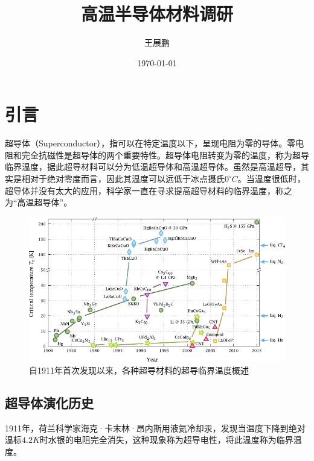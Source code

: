 \documentclass[UTF8, twocolumn]{ctexart}
\title{\fangsong 高温半导体材料调研}
\author{\kaishu 王展鹏}
\date{\today}
\begin{document}

\section{引言}

    超导体（Superconductor），指可以在特定温度以下，呈现电阻为零的导体。零电阻和完全抗磁性是超导体的两个重要特性。超导体电阻转变为零的温度，称为超导临界温度，据此超导材料可以分为低温超导体和高温超导体。虽然是高温超导，其实是相对于绝对零度而言，因此其温度可以远低于冰点摄氏$ 0 ^\circ C$。当温度很低时，超导体并没有太大的应用，科学家一直在寻求提高超导材料的临界温度，称之为“高温超导体”。

    \begin{figure}[hb]
        \centering
        \includegraphics[scale=1.2]{image/Timeline_of_Superconductivity_from_1900_to_2015.pdf}
        \caption{自1911年首次发现以来，各种超导材料的超导临界温度概述}
        \label{fig:image1}
    \end{figure}

    \subsection{超导体演化历史}
    1911年，荷兰科学家海克·卡末林·昂内斯用液氦冷却汞，发现当温度下降到绝对温标$4.2K$时水银的电阻完全消失，这种现象称为超导电性，将此温度称为临界温度。
\end{document}
